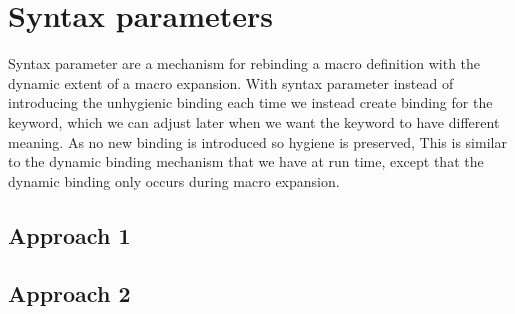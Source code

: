 \chapter{Syntax parameters}

Syntax parameter are a mechanism for rebinding a macro definition with the dynamic extent of a macro expansion. With syntax parameter instead of introducing the unhygienic binding each time we instead create binding for the keyword, which we can adjust later when we want the keyword to have different meaning. As no new binding is introduced so hygiene is preserved, This is similar to the dynamic binding mechanism that we have at run time, except that the dynamic binding only occurs during macro expansion.

\section{Approach 1}

\section{Approach 2}